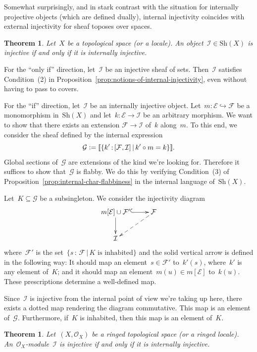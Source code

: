 \documentclass[10pt,reqno,a4paper]{amsbook}
\makeatletter
\theoremstyle{definition}
\theoremstyle{plain}
\newtheorem{thm}[defn]{Theorem}
\theoremstyle{remark}
\newcommand{\E}{\mathcal{E}}
\newcommand{\F}{\mathcal{F}}
\newcommand{\G}{\mathcal{G}}
\renewcommand{\O}{\mathcal{O}}
\newcommand{\I}{\mathcal{I}}
\newcommand{\Sh}{\mathrm{Sh}}
\newcommand{\?}{\,{:}\,}
\renewcommand{\_}{\mathpunct{.}\,}
\newcommand{\brak}[1]{{\llbracket{#1}\rrbracket}}
\newcommand{\defeq}{\vcentcolon=}
\renewenvironment{proof}[1][\proofname]{\par
  \pushQED{\qed}%
  \normalfont \topsep6\p@\@plus6\p@\relax
  \trivlist
  \item[\hskip\labelsep
        \itshape
    #1\@addpunct{.}]\ignorespaces
}{%
  \popQED\endtrivlist\@endpefalse
}
\makeatother
\begin{document}
Somewhat surprisingly, and in stark contrast with the situation for internally
projective objects (which are defined dually), internal injectivity coincides
with external injectivity for sheaf toposes over spaces.

\begin{thm}\label{thm:char-injectivity}
Let~$X$ be a topological space (or a locale). An object~$\I \in \Sh(X)$ is
injective if and only if it is internally injective.
\end{thm}

\begin{proof}For the ``only if'' direction, let~$\I$ be an injective sheaf of
sets. Then~$\I$ satisfies Condition~(2) in
Proposition~\ref{prop:notions-of-internal-injectivity}, even without having to
pass to covers.

For the ``if'' direction, let~$\I$ be an internally injective object. Let~$m :
\E \hookrightarrow \F$ be a monomorphism in~$\Sh(X)$ and let~$k : \E \to \I$ be an arbitrary
morphism. We want to show that there exists an extension $\F \to \I$ of~$k$
along~$m$. To this end, we consider the sheaf defined by the internal expression
\[ \G \defeq \brak{\{ k' \? [\F,\I] \,|\, k' \circ m = k \}}. \]
Global sections of~$\G$ are extensions of the kind we're looking for.
Therefore it suffices to show that~$\G$ is flabby. We do this by verifying
Condition~(3) of Proposition~\ref{prop:internal-char-flabbiness} in the internal
language of~$\Sh(X)$.

Let~$K \subseteq \G$ be a subsingleton. We consider the injectivity diagram
\[ \xymatrix{
  m[\E] \cup \F' \ar@{^{(}->}[r]\ar[d] & \F \ar@{-->}[ld] \\
  \I
} \]
where~$\F'$ is the set~$\{ s \? \F \,|\, \text{$K$ is inhabited} \}$ and the solid
vertical arrow is defined in the following way: It should map an element~$s \in
\F'$ to~$k'(s)$, where~$k'$ is any element of~$K$; and it should map an
element~$m(u) \in m[\E]$ to~$k(u)$. These prescriptions determine a well-defined
map.

Since~$\I$ is injective from the internal point of view we're taking up here,
there exists a dotted map rendering the diagram commutative. This map is an
element of~$\G$. Furthermore, if~$K$ is inhabited, then this map is an element of~$K$.
\end{proof}

\begin{thm}\label{thm:char-injectivity-modules}
Let~$(X,\O_X)$ be a ringed topological space (or a ringed locale).
An~$\O_X$-module~$\I$ is injective if and only if it is internally injective.
\end{thm}
\end{document}
